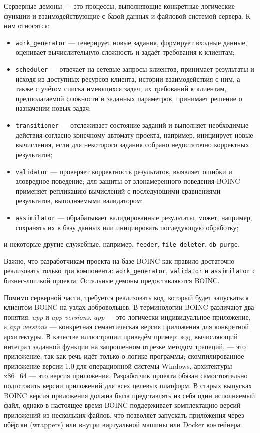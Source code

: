 \documentclass[a4paper,12pt]{extarticle}
\begin{document}
Серверные демоны — это процессы, выполняющие конкретные логические функции и взаимодействующие с базой данных и файловой системой сервера.
К ним относятся:
\begin{itemize}
    \item \texttt{work\_generator} — генерирует новые задания, формирует входные данные, оценивает вычислительную сложность и задаёт требования к клиентам;
    \item \texttt{scheduler} — отвечает на сетевые запросы клиентов, принимает результаты и исходя из доступных ресурсов клиента, истории взаимодействия с ним, а также с учётом списка имеющихся задач, их требований к клиентам, предполагаемой сложности и заданных параметров, принимает решение о назначении новых задач;
    \item \texttt{transitioner} — отслеживает состояние заданий и выполняет необходимые действия согласно конечному автомату проекта, например, инициирует новые вычисления, если для некоторого задания собрано недостаточно корректных результатов;
    \item \texttt{validator} — проверяет корректность результатов, выявляет ошибки и зловредное поведение; для защиты от злонамеренного поведения BOINC применяет репликацию вычислений с последующими сравнениями результатов, выполняемыми валидатором;
    \item \texttt{assimilator} — обрабатывает валидированные результаты, может, например, сохранять их в базу данных или инициировать последующую обработку;
\end{itemize}
и некоторые другие служебные, например, \texttt{feeder}, \texttt{file\_deleter}, \texttt{db\_purge}.

Важно, что разработчикам проекта на базе BOINC как правило достаточно реализовать только три компонента: \texttt{work\_generator}, \texttt{validator} и \texttt{assimilator} с бизнес-логикой проекта.
Остальные демоны предоставляются BOINC.

Помимо серверной части, требуется реализовать код, который будет запускаться клиентом BOINC на узлах добровольцев.
В терминологии BOINC различают два понятия: \textit{app} и \textit{app versions}.
\textit{app} — это логически индивидуальное приложение, а \textit{app versions} — конкретная семантическая версия приложения для конкретной архитектуры.
В качестве иллюстрации приведём пример: код, вычисляющий интеграл заданной функции на запрошенном отрезке методом трапеций, — это приложение, так как речь идёт только о логике программы; скомпилированное приложение версии 1.0 для операционной системы Windows, архитектуры x86\_64 — это версия приложения.
Разработчик проекта обязан самостоятельно подготовить версии приложений для всех целевых платформ.
В старых выпусках BOINC версия приложения должна была представлять из себя один исполняемый файл, однако в настоящее время BOINC поддерживает комплектацию версий приложений из нескольких файлов, что позволяет запускать приложения через обёртки (wrappers) или внутри виртуальной машины или Docker контейнера.
\end{document}
